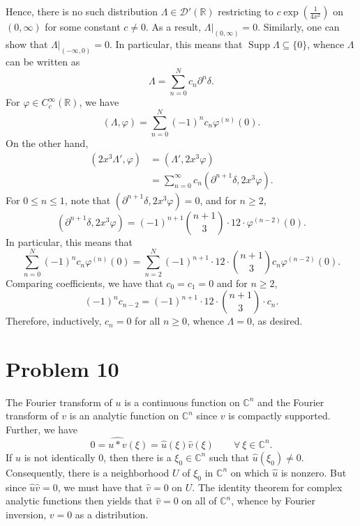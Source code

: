 \documentclass[10pt]{amsart}
\theoremstyle{thmstyle}
\theoremstyle{defstyle}
\newcommand{\R}{\mathbb{R}}
\newcommand{\bbC}{\mathbb{C}}
\newcommand{\Supp}{\operatorname{Supp}}
\newcommand{\wh}[1]{\widehat{#1}}
\renewcommand{\le}{\leqslant}
\renewcommand{\ge}{\geqslant}
\begin{document}
Hence, there is no such distribution $\Lambda\in\mathscr D'(\R)$ restricting to $c\exp\left(\frac{1}{4x^2}\right)$ on $(0,\infty)$ for some constant $c\ne 0$. As a result, $\Lambda|_{(0, \infty)} = 0$. Similarly, one can show that $\Lambda|_{(-\infty, 0)} = 0$. In particular, this means that $\Supp\Lambda\subseteq\{0\}$, whence $\Lambda$ can be written as 
\begin{equation*}
    \Lambda = \sum_{n = 0}^N c_n \partial^n\delta.
\end{equation*}
For $\varphi\in C_c^\infty(\R)$, we have 
\begin{equation*}
    (\Lambda, \varphi) = \sum_{n = 0}^N (-1)^n c_n\varphi^{(n)}(0).
\end{equation*}
On the other hand, 
\begin{align*}
    \left(2x^3\Lambda', \varphi\right) &= \left(\Lambda', 2x^3\varphi\right)\\
    &= \sum_{n = 0}^\infty c_n\left(\partial^{n + 1}\delta, 2x^3\varphi\right).
\end{align*}
For $0\le n\le 1$, note that $(\partial^{n + 1}\delta, 2x^3\varphi) = 0$, and for $n\ge 2$, 
\begin{equation*}
    \left(\partial^{n + 1}\delta, 2x^3\varphi\right) = (-1)^{n + 1}\binom{n + 1}{3}\cdot 12\cdot\varphi^{(n - 2)}(0).
\end{equation*}
In particular, this means that 
\begin{equation*}
    \sum_{n = 0}^N (-1)^n c_n\varphi^{(n)}(0) = \sum_{n = 2}^{N} (-1)^{n + 1}\cdot 12\cdot\binom{n + 1}{3}c_n\varphi^{(n - 2)}(0).
\end{equation*}
Comparing coefficients, we have that $c_0 = c_1 = 0$ and for $n\ge 2$,
\begin{equation*}
    (-1)^n c_{n - 2} = (-1)^{n + 1}\cdot 12\cdot \binom{n + 1}{3}\cdot c_n.
\end{equation*}
Therefore, inductively, $c_n = 0$ for all $n\ge 0$, whence $\Lambda = 0$, as desired.

\section{Problem 10}

The Fourier transform of $u$ is a continuous function on $\bbC^n$ and the Fourier transform of $v$ is an analytic function on $\bbC^n$ since $v$ is compactly supported. Further, we have 
\begin{equation*}
    0 = \wh{u\ast v}(\xi) = \wh u(\xi)\wh v(\xi)\qquad\forall~\xi\in\bbC^n.
\end{equation*}
If $\wh u$ is not identically $0$, then there is a $\xi_0\in\bbC^n$ such that $\wh u(\xi_0)\ne 0$. Consequently, there is a neighborhood $U$ of $\xi_0$ in $\bbC^n$ on which $\wh u$ is nonzero. But since $\wh u\wh v = 0$, we must have that $\wh v = 0$ on $U$. The identity theorem for complex analytic functions then yields that $\wh v = 0$ on all of $\bbC^n$, whence by Fourier inversion, $v = 0$ as a distribution.
\end{document}
